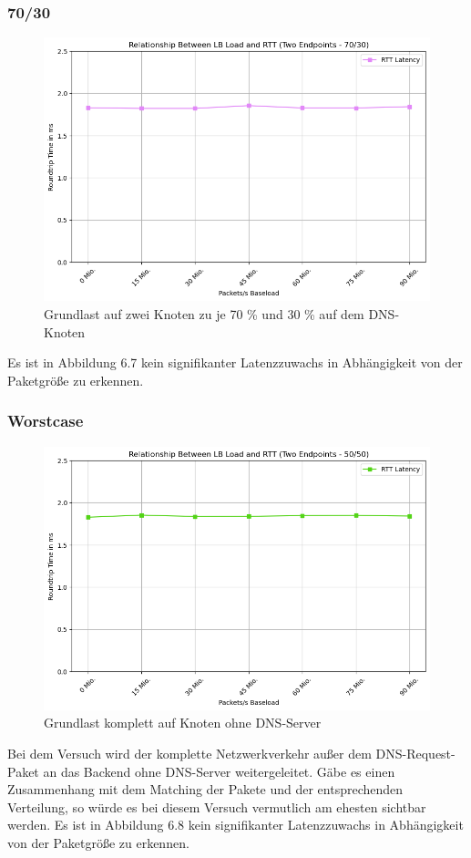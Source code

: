 \subsubsection{70/30}
\begin{figure}
    \centering
    \includegraphics[width=0.8\linewidth]{images/70_30.png}
    \caption{Grundlast auf zwei Knoten zu je 70 \% und 30 \% auf dem DNS-Knoten}
    \label{fig:enter-label}
\end{figure}
Es ist in Abbildung 6.7 kein signifikanter Latenzzuwachs in Abhängigkeit von der Paketgröße zu erkennen.
\subsubsection{Worstcase}
\begin{figure}
    \centering
    \includegraphics[width=0.8\linewidth]{images/50_50.png}
    \caption{Grundlast komplett auf Knoten ohne DNS-Server}
    \label{fig:enter-label}
\end{figure}
Bei dem Versuch wird der komplette Netzwerkverkehr außer dem DNS-Request-Paket an das Backend ohne DNS-Server weitergeleitet. Gäbe es einen Zusammenhang mit dem Matching der Pakete und der entsprechenden Verteilung, so würde es bei diesem Versuch vermutlich am ehesten sichtbar werden.
Es ist in Abbildung 6.8 kein signifikanter Latenzzuwachs in Abhängigkeit von der Paketgröße zu erkennen.

